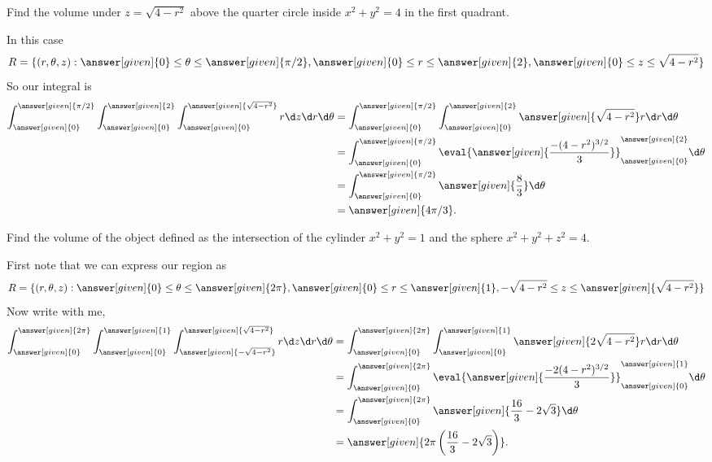 \documentclass{ximera}
\begin{document}
\begin{example}
  Find the volume under $z= \sqrt{4-r^2}$ above the quarter circle
  inside $x^2 + y^2 = 4$ in the first quadrant.
  \begin{explanation}
    In this case
    \[
    R=\{(r,\theta,z):\answer[given]{0}\leq\theta\leq\answer[given]{\pi/2}, \answer[given]{0}\leq r\leq \answer[given]{2}, \answer[given]{0}\le z\le \sqrt{4-r^2}\}
    \]
    So our integral is
    \begin{align*}
      \int_{\answer[given]{0}}^{\answer[given]{\pi/2}}
      \int_{\answer[given]{0}}^{\answer[given]{2}}
      \int_{\answer[given]{0}}^{\answer[given]{\sqrt{4-r^2}}} r \d z \d r \d \theta
      &=
      \int_{\answer[given]{0}}^{\answer[given]{\pi/2}}
      \int_{\answer[given]{0}}^{\answer[given]{2}}
      \answer[given]{\sqrt{4-r^2}} r \d r \d \theta\\
      &=\int_{\answer[given]{0}}^{\answer[given]{\pi/2}}
      \eval{\answer[given]{\frac{-(4-r^2)^{3/2}}{3}}}_{\answer[given]{0}}^{\answer[given]{2}}  \d \theta\\
      &=\int_{\answer[given]{0}}^{\answer[given]{\pi/2}}
      \answer[given]{\frac{8}{3}}  \d \theta\\
      &=\answer[given]{4\pi/3}.
    \end{align*}
  \end{explanation}
\end{example}

\begin{example}
  Find the volume of the object defined as the intersection of the
  cylinder $x^2+y^2=1$ and the sphere $x^2+y^2+z^2=4$.
  \begin{explanation}
    First note that we can express our region as
    \[
    R=\{(r,\theta,z):\answer[given]{0}\leq\theta\leq\answer[given]{2\pi}, \answer[given]{0}\leq r\leq \answer[given]{1}, -\sqrt{4-r^2}\le z\le \answer[given]{\sqrt{4-r^2}}\}
    \]
    Now write with me,
    \begin{align*}
      \int_{\answer[given]{0}}^{\answer[given]{2\pi}}
      \int_{\answer[given]{0}}^{\answer[given]{1}}
      \int_{\answer[given]{-\sqrt{4-r^2}}}^{\answer[given]{\sqrt{4-r^2}}} r \d z \d r \d \theta
      &=
      \int_{\answer[given]{0}}^{\answer[given]{2\pi}}
      \int_{\answer[given]{0}}^{\answer[given]{1}}
      \answer[given]{2\sqrt{4-r^2}} r \d r \d \theta\\
      &=\int_{\answer[given]{0}}^{\answer[given]{2\pi}}
      \eval{\answer[given]{\frac{-2(4-r^2)^{3/2}}{3}}}_{\answer[given]{0}}^{\answer[given]{1}}  \d \theta\\
      &=\int_{\answer[given]{0}}^{\answer[given]{2\pi}}
      \answer[given]{\frac{16}{3}-2\sqrt{3}}  \d \theta\\
      &=\answer[given]{2\pi\left(\frac{16}{3}-2\sqrt{3}\right)}.
    \end{align*}
  \end{explanation}
\end{example}
\end{document}
